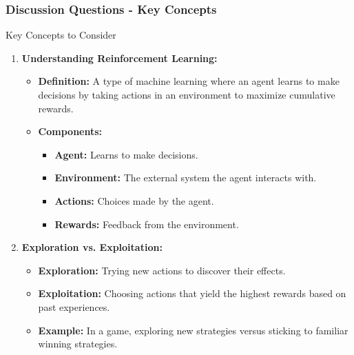 \documentclass[aspectratio=169]{beamer}
\begin{document}
\begin{frame}[fragile]
  \frametitle{Discussion Questions - Key Concepts}
  \begin{block}{Key Concepts to Consider}
    \begin{enumerate}
      \item \textbf{Understanding Reinforcement Learning:}
        \begin{itemize}
          \item \textbf{Definition:} A type of machine learning where an agent learns to make decisions by taking actions in an environment to maximize cumulative rewards.
          \item \textbf{Components:}
            \begin{itemize}
              \item \textbf{Agent:} Learns to make decisions.
              \item \textbf{Environment:} The external system the agent interacts with.
              \item \textbf{Actions:} Choices made by the agent.
              \item \textbf{Rewards:} Feedback from the environment.
            \end{itemize}
        \end{itemize}
      \item \textbf{Exploration vs. Exploitation:}
        \begin{itemize}
          \item \textbf{Exploration:} Trying new actions to discover their effects.
          \item \textbf{Exploitation:} Choosing actions that yield the highest rewards based on past experiences.
          \item \textbf{Example:} In a game, exploring new strategies versus sticking to familiar winning strategies.
        \end{itemize}
    \end{enumerate}
  \end{block}
\end{frame}
\end{document}

